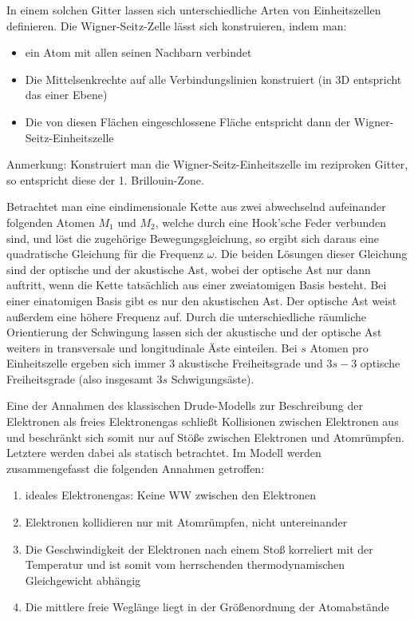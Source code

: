 In einem solchen Gitter lassen sich unterschiedliche Arten von Einheitszellen definieren. Die Wigner-Seitz-Zelle lässt sich konstruieren, indem man:
\begin{itemize}
    \item ein Atom mit allen seinen Nachbarn verbindet
    \item Die Mittelsenkrechte auf alle Verbindungslinien konstruiert (in 3D entspricht das einer Ebene)
    \item Die von diesen Flächen eingeschlossene Fläche entspricht dann der Wigner-Seitz-Einheitszelle
\end{itemize}
Anmerkung: Konstruiert man die Wigner-Seitz-Einheitszelle im reziproken Gitter, so entspricht diese der 1. Brillouin-Zone.

\label{q:55}

Betrachtet man eine eindimensionale Kette aus zwei abwechselnd aufeinander folgenden Atomen $M_1$ und $M_2$, welche durch eine Hook'sche Feder verbunden sind, und löst die zugehörige Bewegungsgleichung, so ergibt sich daraus eine quadratische Gleichung für die Frequenz $\omega$. Die beiden Lösungen dieser Gleichung sind der optische und der akustische Ast, wobei der optische Ast nur dann auftritt, wenn die Kette tatsächlich aus einer zweiatomigen Basis besteht. Bei einer einatomigen Basis gibt es nur den akustischen Ast. Der optische Ast weist außerdem eine höhere Frequenz auf. Durch die unterschiedliche räumliche Orientierung der Schwingung lassen sich der akustische und der optische Ast weiters in transversale und longitudinale Äste einteilen. Bei $s$ Atomen pro Einheitszelle ergeben sich immer $3$ akustische Freiheitsgrade und $3s-3$ optische Freiheitsgrade (also insgesamt $3s$ Schwigungsäste).

\label{q:56}

Eine der Annahmen des klassischen Drude-Modells zur Beschreibung der Elektronen als freies Elektronengas schließt Kollisionen zwischen Elektronen aus und beschränkt sich somit nur auf Stöße zwischen Elektronen und Atomrümpfen. Letztere werden dabei als statisch betrachtet. Im Modell werden zusammengefasst die folgenden Annahmen getroffen:

\begin{enumerate}
    \item ideales Elektronengas: Keine WW zwischen den Elektronen
    \item Elektronen kollidieren nur mit Atomrümpfen, nicht untereinander
    \item Die Geschwindigkeit der Elektronen nach einem Stoß korreliert mit der Temperatur und ist somit vom herrschenden thermodynamischen Gleichgewicht abhängig
    \item Die mittlere freie Weglänge liegt in der Größenordnung der Atomabstände
\end{enumerate}

